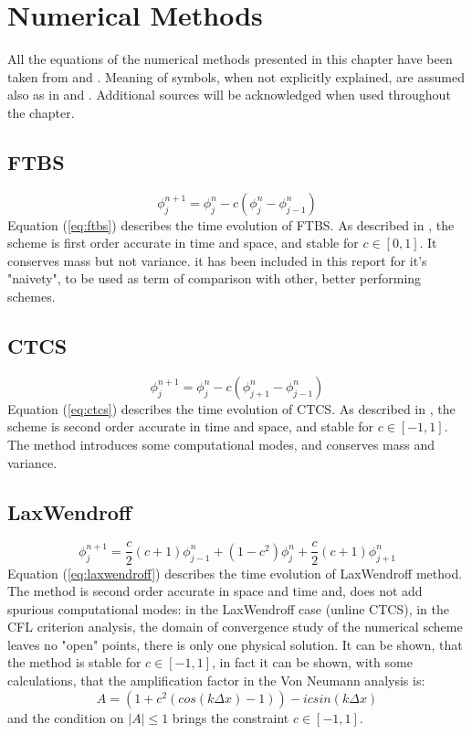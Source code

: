 
\section{Numerical Methods}
All the equations of the numerical methods presented in this chapter have been taken from \cite{mpebook} and \cite{nmnotes}. Meaning of symbols, when not explicitly explained, are assumed also as in \cite{mpebook} and \cite{nmnotes}. Additional sources will be acknowledged when used throughout the chapter.

\subsection{FTBS}

\begin{equation}
\phi_j^{n+1}=\phi_j^{n}-c(\phi_j^{n}-\phi_{j-1}^{n})
\label{eq:ftbs}
\end{equation}
Equation (\ref{eq:ftbs}) describes the time evolution of FTBS. As described in \cite{mpebook}, the scheme is first order accurate in time and space, and stable for $c\in[0,1]$. It conserves mass but not variance. it has been included in this report for it's "naivety", to be used as term of comparison with other, better performing schemes.


\subsection{CTCS}
\begin{equation}
\phi_j^{n+1}=\phi_j^{n}-c(\phi_{j+1}^{n}-\phi_{j-1}^{n})
\label{eq:ctcs}
\end{equation}
Equation (\ref{eq:ctcs}) describes the time evolution of CTCS. As described in \cite{mpebook}, the scheme is second order accurate in time and space, and stable for $c\in[-1,1]$. The method introduces some computational modes, and conserves mass and variance.


\subsection{LaxWendroff}
\begin{equation}
\phi_j^{n+1}=\frac{c}{2}(c+1)\phi_{j-1}^{n}+(1-c^2)\phi_{j}^{n}+\frac{c}{2}(c+1)\phi_{j+1}^{n}
\label{eq:laxwendroff}
\end{equation}
Equation (\ref{eq:laxwendroff}) describes the time evolution of LaxWendroff method. The method is second order accurate in space and time and, does not add spurious computational modes: in the LaxWendroff case (unline CTCS), in the CFL criterion analysis, the domain of convergence study of the numerical scheme leaves no "open" points, there is only one physical solution. It can be shown, that the method is stable for $c\in[-1,1]$, in fact it can be shown, with some calculations, that the amplification factor in the Von Neumann analysis is:
\begin{equation}
\label{eq:laxwen_vonneumann}
A=(1+c^2(cos(k\Delta x)-1))-icsin(k\Delta x)
\end{equation}
and the condition on $|A|\leq1$ brings the constraint $c\in[-1,1]$.

